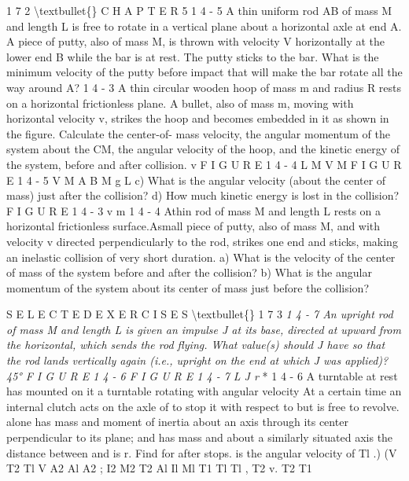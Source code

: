 \documentclass[10pt,oneside]{article}
\begin{document}
1 7 2 \textbackslash{}textbullet\{\} C H A P T E R  5 \emph{ } 1 4 - 5 A thin uniform rod AB of mass M and length L is free to rotate in a vertical plane about a horizontal axle at end A. A piece of putty, also of mass M, is thrown with velocity V horizontally at the lower end B while the bar is at rest. The putty sticks to the bar. What is the minimum velocity of the putty before impact that will make the bar rotate all the way around A? \emph{ } 1 4 - 3 A thin circular wooden hoop of mass m and radius R rests on a horizontal frictionless plane. A bullet, also of mass m, moving with horizontal velocity v, strikes the hoop and becomes embedded in it as shown in the figure. Calculate the center-of- mass velocity, the angular momentum of the system about the CM, the angular velocity of the hoop, and the kinetic energy of the system, before and after collision. v F I G U R E  1 4 - 4 L M V M F I G U R E  1 4 - 5 V M A B M g L c) What is the angular velocity (about the center of mass) just after the collision? d) How much kinetic energy is lost in the collision? F I G U R E  1 4 - 3 v m \emph{ } 1 4 - 4 Athin rod of mass M and length L rests on a horizontal frictionless surface.Asmall piece of putty, also of mass M, and with velocity v directed perpendicularly to the rod, strikes one end and sticks, making an inelastic collision of very short duration. a) What is the velocity of the center of mass of the system before and after the collision? b) What is the angular momentum of the system about its center of mass just before the collision?\par

S E L E C T E D  E X E R C I S E S \textbackslash{}textbullet\{\} 1 7 3 \emph{ } \emph{ 1 4 - 7 An upright rod of mass M and length L is given an impulse J at its base, directed at upward from the horizontal, which sends the rod flying. What value(s) should J have so that the rod lands vertically again (i.e., upright on the end at which J was applied)? 45° F I G U R E  1 4 - 6 F I G U R E  1 4 - 7 L J r } * 1 4 - 6 A turntable at rest has mounted on it a turntable rotating with angular velocity At a certain time an internal clutch acts on the axle of to stop it with respect to but is free to revolve. alone has mass and moment of inertia about an axis through its center perpendicular to its plane; and has mass and about a similarly situated axis the distance between and is r. Find for after stops. is the angular velocity of Tl .) (V T2 Tl V A2 Al A2 ; I2 M2 T2 Al Il Ml T1 Tl Tl , T2 v. T2 T1\par
\end{document}
